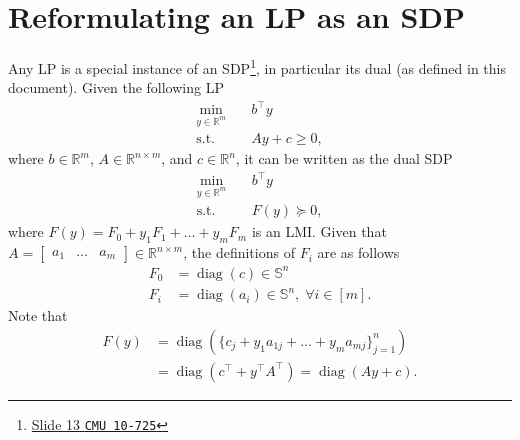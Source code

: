 \documentclass[a4paper]{article}
\DeclareMathOperator{\diag}{diag}
\begin{document}
\section*{Reformulating an LP as an SDP}
Any LP is a special instance of an SDP\footnote{\href{http://www.stat.cmu.edu/~ryantibs/convexopt-F13/lectures/18-semidefiniteprogramming.pdf}{Slide 13 \texttt{CMU 10-725}}}, in particular its dual (as defined in this document).
Given the following LP
\begin{equation}\label{eq:general-lp}
\begin{split}
\min_{y\in\mathbb{R}^m}  \quad & b^\top y\\
\textrm{s.t. } \quad & Ay + c \ge 0,
\end{split}
\end{equation}
where $b\in\mathbb{R}^m$, $A\in\mathbb{R}^{n\times m}$, and $c\in\mathbb{R}^n$, it can be written as the dual SDP
\begin{equation}\label{eq:general-lp-sdp}
\begin{split}
\min_{y\in\mathbb{R}^m}  \quad & b^\top y\\
\textrm{s.t. } \quad & F(y) \succeq 0,
\end{split}
\end{equation}
where $F(y) = F_0 + y_1F_1 + \dots + y_mF_m$ is an LMI.
Given that $A = \begin{bmatrix}a_1 & \dots & a_m\end{bmatrix}\in\mathbb{R}^{n\times m}$, the definitions of $F_i$ are as follows
\begin{align*}
F_0 &= \diag(c) \in\mathbb{S}^n \\
F_i &= \diag(a_i) \in\mathbb{S}^n,\;\forall i\in[m].
\end{align*}
Note that
\begin{align}
F(y) &= \diag(\{c_j + y_1 a_{1j} + \dots + y_m a_{mj}\}^n_{j=1}) \\
     &= \diag(c^\top + y^\top A^\top) = \diag(Ay + c).
\end{align}
\end{document}
